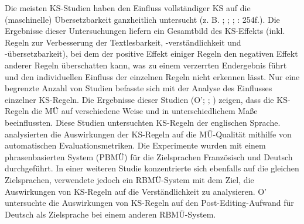 Die meisten KS-Studien haben den Einfluss vollständiger KS auf die (maschinelle) Übersetzbarkeit ganzheitlich untersucht (z. B. \citealt{SpyridakisEtAl1997}; \citealt{KamprathEtAl1998}; \citealt{Bernth1999}; \citealt{NybergEtAl2003}: 254f.). Die Ergebnisse dieser Untersuchungen liefern ein Gesamtbild des KS-Effekts (inkl. Regeln zur Verbesserung der Textlesbarkeit, -verständlichkeit und -übersetzbarkeit), bei dem der positive Effekt einiger Regeln den negativen Effekt anderer Regeln überschatten kann, was zu einem verzerrten Endergebnis führt und den individuellen Einfluss der einzelnen Regeln nicht erkennen lässt. Nur eine begrenzte Anzahl von Studien befasste sich mit der Analyse des Einflusses einzelner KS-Regeln. Die Ergebnisse dieser Studien (O’\citealt{Brien2006}; \citealt{Roturier2006}; \citealt{RoturierEtAl2012}) zeigen, dass die KS-Regeln die MÜ auf verschiedene Weise und in unterschiedlichem Maße beeinflussten. Diese Studien untersuchten KS-Regeln der englischen Sprache. \citet{RoturierEtAl2012} analysierten die Auswirkungen der KS-Regeln auf die MÜ-Qualität mithilfe von automatischen Evaluationsmetriken. Die Experimente wurden mit einem phrasenbasierten System (PBMÜ) für die Zielsprachen Französisch und Deutsch durchgeführt. In einer weiteren Studie konzentrierte sich \citet{Roturier2006} ebenfalls auf die gleichen Zielsprachen, verwendete jedoch ein RBMÜ-System mit dem Ziel, die Auswirkungen von KS-Regeln auf die Verständlichkeit zu analysieren. O'\citet{Brien2006} untersuchte die Auswirkungen von KS-Regeln auf den Post-Editing-Aufwand für Deutsch als Zielsprache bei einem anderen RBMÜ-System.

